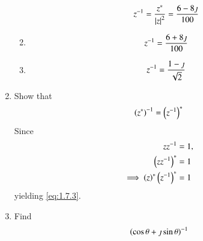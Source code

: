 \begin{enumerate}[label=\arabic*.,ref=\thesubsection.\theenumi]
\begin{enumerate}
				\begin{align}
					z^{-1} = \frac{z^{*}}{\left\vert z\right\vert^2} = \frac{6-8\jmath}{100}
				\end{align}
			\item 
				\begin{align}
					z^{-1} =  \frac{6+8\jmath}{100}
				\end{align}
			\item 
				\begin{align}
					z^{-1} =  \frac{1-\jmath}{\sqrt{2}}
				\end{align}
		\end{enumerate}
	\item Show that 
				\begin{align}
					\label{eq:1.7.3}
		\left(z^{*}\right)^{-1} = \left(z^{-1}\right)^{*}
				\end{align}
		\solution Since
				\begin{align}
						zz^{-1} &= 1, 
\\
						\left(zz^{-1}\right)^{*} &= 1 
						\\
						\implies 
						\left(z\right)^{*}\left(z^{-1}\right)^{*} &= 1 
				\end{align}
				yielding
					\eqref{eq:1.7.3}.
				\item Find 
				\begin{align}
					\left(\cos \theta + \jmath \sin \theta\right)^{-1}
				\end{align}



\end{enumerate}
